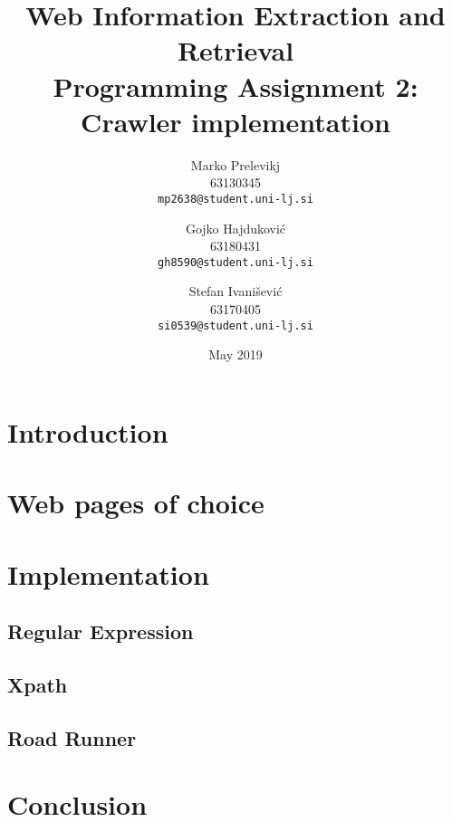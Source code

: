 \documentclass{article}
\title{
Web Information Extraction and Retrieval\\
Programming Assignment 2: \\
Crawler implementation
}
\author{
  Marko Prelevikj\\
  63130345\\
  \texttt{mp2638@student.uni-lj.si}
  \and
  Gojko Hajduković\\
  63180431\\
  \texttt{gh8590@student.uni-lj.si}
  \and
  Stefan Ivanišević\\
  63170405\\
  \texttt{si0539@student.uni-lj.si}
}
\date{May 2019}
\begin{document}
\maketitle

\section{Introduction}
\section{Web pages of choice}
\section{Implementation}
\subsection{Regular Expression}
\subsection{Xpath}
\subsection{Road Runner}
\section{Conclusion}
\end{document}
